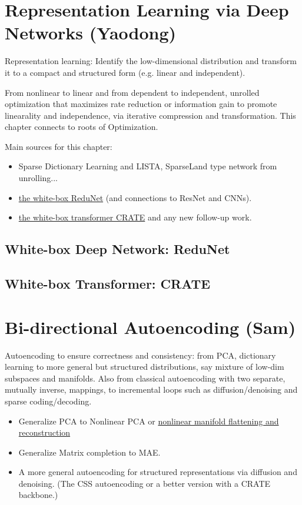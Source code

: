 \documentclass{article}
\begin{document}
\section{Representation Learning via Deep Networks (Yaodong)}
Representation learning: Identify the low-dimensional distribution and transform it to a compact and structured form (e.g. linear and independent). 

From nonlinear to linear and from dependent to independent, unrolled optimization that maximizes rate reduction or information gain to promote linearality and independence, via iterative compression and transformation. This chapter connects to roots of Optimization. 

Main sources for this chapter: 
\begin{itemize}
\item Sparse Dictionary Learning and LISTA, SparseLand type network from unrolling... 
\item \href{https://jmlr.org/papers/v23/21-0631.html}{the white-box ReduNet} (and connections to ResNet and CNNs).
\item \href{https://arxiv.org/abs/2306.01129}{the white-box transformer CRATE} and any new follow-up work.
\end{itemize}

\subsection{White-box Deep Network: ReduNet}

\subsection{White-box Transformer: CRATE}

\section{Bi-directional Autoencoding (Sam)}
Autoencoding to ensure correctness and consistency: from PCA, dictionary learning to more general but structured distributions, say mixture of low-dim subspaces and  manifolds. Also from classical autoencoding with two separate, mutually inverse, mappings, to incremental loops such as diffusion/denoising and sparse coding/decoding. 

\begin{itemize}
    \item Generalize PCA to Nonlinear PCA or \href{https://arxiv.org/abs/2305.01777}{nonlinear manifold flattening and reconstruction} 
    \item  Generalize Matrix completion to MAE.
\item A more general autoencoding for structured representations via diffusion and denoising. (The CSS autoencoding or a better version with a CRATE backbone.)
\end{itemize}
\end{document}
